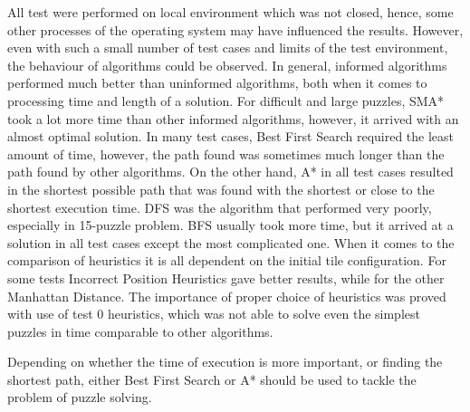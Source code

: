 \documentclass[12pt]{article}
\begin{document}
All test were performed on local environment which was not closed, hence, some other processes of the operating system may have influenced the results. However, even with such a small number of test cases and limits of the test environment, the behaviour of algorithms could be observed. In general, informed algorithms  performed much better than uninformed algorithms, both when it comes to processing time and length of a solution. For difficult and large puzzles, SMA* took a lot more time than other informed algorithms, however, it arrived with an almost optimal solution. In many test cases, Best First Search required the least amount of time, however, the path found was sometimes much longer than the path found by other algorithms. On the other hand, A* in all test cases resulted in the shortest possible path that was found with the shortest  or close to the shortest execution time. DFS was the algorithm that performed very poorly, especially in 15-puzzle problem. BFS usually took more time, but it arrived at a solution in all test cases except the most complicated one. When it comes to the comparison of heuristics it is all dependent on the initial tile configuration. For some tests Incorrect Position Heuristics gave better results, while for the other Manhattan Distance. The importance of proper choice of heuristics was proved with use of test 0 heuristics, which was not able to solve even the simplest puzzles in time comparable to other algorithms. 

Depending on whether the time of execution is more important, or finding the shortest path, either Best First Search or A* should be used to tackle the problem of puzzle solving. 



\newpage
\listoffigures
\newpage
\printbibliography
\end{document}
